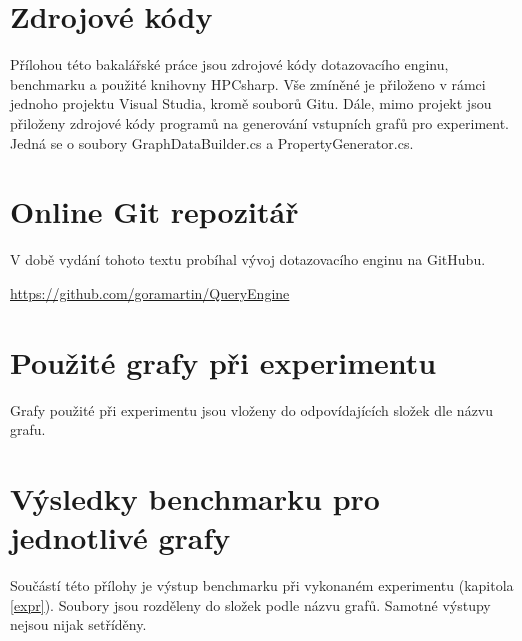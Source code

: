 \section{Zdrojové kódy}
\label{prilohy.kod}

Přílohou této bakalářské práce jsou zdrojové kódy dotazovacího enginu, benchmarku a použité knihovny HPCsharp.
Vše zmíněné je přiloženo v rámci jednoho projektu Visual Studia, kromě souborů Gitu. Dále, mimo projekt jsou přiloženy
zdrojové kódy programů na generování vstupních grafů pro experiment. Jedná se o soubory GraphDataBuilder.cs a PropertyGenerator.cs.

\section{Online Git repozitář}
\label{prilohy.repo}

V době vydání tohoto textu probíhal vývoj dotazovacího enginu na GitHubu.

\begin{center}
\url{https://github.com/goramartin/QueryEngine}
\end{center}

\section{Použité grafy při experimentu}
\label{prilohy.grafy}

Grafy použité při experimentu jsou vloženy do odpovídajících složek dle názvu grafu. 

\section{Výsledky benchmarku pro jednotlivé grafy}
\label{prilohy.grafyVysledky}

Součástí této přílohy je výstup benchmarku při vykonaném experimentu (kapitola \ref{expr}).
Soubory jsou rozděleny do složek podle názvu grafů.
Samotné výstupy nejsou nijak setříděny.